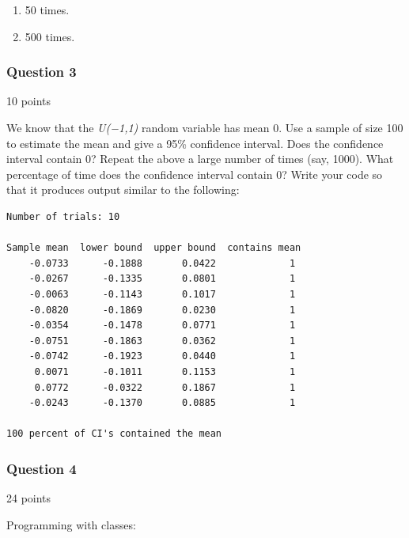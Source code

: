 \documentclass[]{article}
\begin{document}
\begin{enumerate}[1.]
\item
  50 times.
\item
  500 times.
\end{enumerate}

\subsubsection{Question 3}

10 points

We know that the \emph{U(−1,1)} random variable has mean 0. Use a sample
of size 100 to estimate the mean and give a 95\% confidence interval.
Does the confidence interval contain 0? Repeat the above a large number
of times (say, 1000). What percentage of time does the confidence
interval contain 0? Write your code so that it produces output similar
to the following:

\begin{verbatim}
Number of trials: 10

Sample mean  lower bound  upper bound  contains mean
    -0.0733      -0.1888       0.0422             1
    -0.0267      -0.1335       0.0801             1
    -0.0063      -0.1143       0.1017             1
    -0.0820      -0.1869       0.0230             1
    -0.0354      -0.1478       0.0771             1
    -0.0751      -0.1863       0.0362             1
    -0.0742      -0.1923       0.0440             1
     0.0071      -0.1011       0.1153             1
     0.0772      -0.0322       0.1867             1
    -0.0243      -0.1370       0.0885             1

100 percent of CI's contained the mean
\end{verbatim}

\subsubsection{Question 4}

24 points

Programming with classes:
\end{document}
